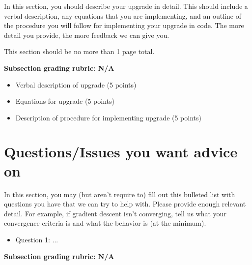 \documentclass[12pt]{article}
\begin{document}
In this section, you should describe your upgrade in detail.  This should include a verbal description, any equations that you are implementing, and an outline of the procedure you will follow for implementing your upgrade in code.  The more detail you provide, the more feedback we can give you.

This section should be no more than 1 page total. 

\textbf{Subsection grading rubric: N/A}
\begin{itemize}
	\item Verbal description of upgrade (5 points)
	\item Equations for upgrade (5 points)
	\item Description of procedure for implementing upgrade (5 points)
\end{itemize}

\section{Questions/Issues you want advice on}

In this section, you may (but aren't require to) fill out this bulleted list with questions you have that we can try to help with.  Please provide enough relevant detail.  For example, if gradient descent isn't converging, tell us what your convergence criteria is and what the behavior is (at the minimum).

\begin{itemize}
	\item Question 1: ...
\end{itemize}

\textbf{Subsection grading rubric: N/A}
\end{document}
